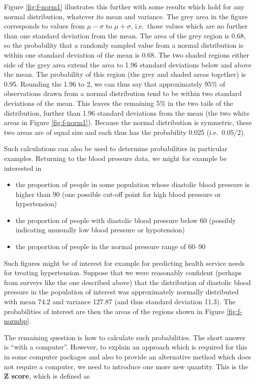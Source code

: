 \documentclass[11pt,a4paper,openany]{book}
\begin{document}
Figure \ref{fig:f-norm1} illustrates this further with some results
which hold for any normal distribution, whatever its mean and variance.
The grey area in the figure corresponds to values from \(\mu-\sigma\) to
\(\mu+\sigma\), i.e.~those values which are no further than one standard
deviation from the mean. The area of the grey region is 0.68, so the
probability that a randomly sampled value from a normal distribution is
within one standard deviation of the mean is 0.68. The two shaded
regions either side of the grey area extend the area to 1.96 standard
deviations below and above the mean. The probability of this region (the
grey and shaded areas together) is 0.95. Rounding the 1.96 to 2, we can
thus say that approximately 95\% of observations drawn from a normal
distribution tend to be within two standard deviations of the mean. This
leaves the remaining 5\% in the two tails of the distribution, further
than 1.96 standard deviations from the mean (the two white areas in
Figure \ref{fig:f-norm1}). Because the normal distribution is symmetric,
these two areas are of equal size and each thus has the probability
0.025 (i.e.~0.05/2).

Such calculations can also be used to determine probabilities in
particular examples. Returning to the blood pressure data, we might for
example be interested in

\begin{itemize}
\item
  the proportion of people in some population whose diastolic blood
  pressure is higher than 90 (one possible cut-off point for high blood
  pressure or hypertension)
\item
  the proportion of people with diastolic blood pressure below 60
  (possibly indicating unusually low blood pressure or hypotension)
\item
  the proportion of people in the normal pressure range of 60--90
\end{itemize}

Such figures might be of interest for example for predicting health
service needs for treating hypertension. Suppose that we were reasonably
confident (perhaps from surveys like the one described above) that the
distribution of diastolic blood pressure in the population of interest
was approximately normally distributed with mean 74.2 and variance
127.87 (and thus standard deviation 11.3). The probabilities of interest
are then the areas of the regions shown in Figure \ref{fig:f-normbp}.

The remaining question is how to calculate such probabilities. The short
answer is ``with a computer''. However, to explain an approach which is
required for this in some computer packages and also to provide an
alternative method which does not require a computer, we need to
introduce one more new quantity. This is the \textbf{Z score}, which is
defined as
\end{document}
